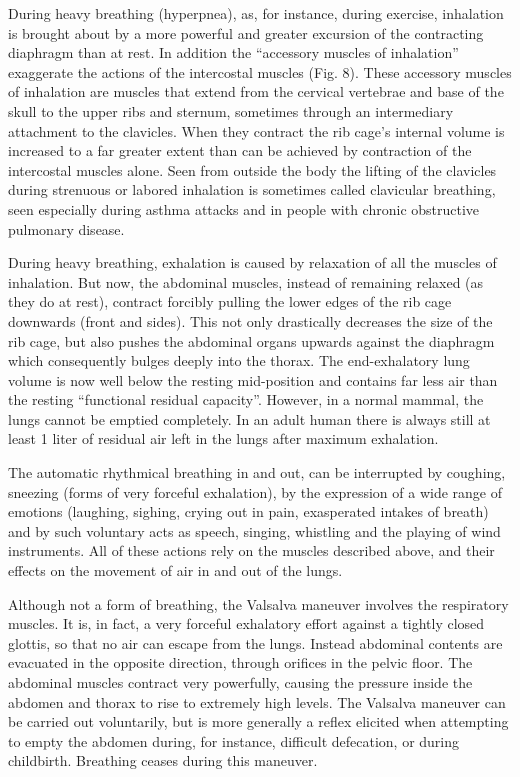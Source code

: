 During heavy breathing (hyperpnea), as, for instance, during exercise, inhalation is brought about by a more powerful and greater excursion of the contracting diaphragm than at rest. In addition the ``accessory muscles of inhalation'' exaggerate the actions of the intercostal muscles (Fig. 8). These accessory muscles of inhalation are muscles that extend from the cervical vertebrae and base of the skull to the upper ribs and sternum, sometimes through an intermediary attachment to the clavicles. When they contract the rib cage's internal volume is increased to a far greater extent than can be achieved by contraction of the intercostal muscles alone. Seen from outside the body the lifting of the clavicles during strenuous or labored inhalation is sometimes called clavicular breathing, seen especially during asthma attacks and in people with chronic obstructive pulmonary disease.

During heavy breathing, exhalation is caused by relaxation of all the muscles of inhalation. But now, the abdominal muscles, instead of remaining relaxed (as they do at rest), contract forcibly pulling the lower edges of the rib cage downwards (front and sides). This not only drastically decreases the size of the rib cage, but also pushes the abdominal organs upwards against the diaphragm which consequently bulges deeply into the thorax. The end-exhalatory lung volume is now well below the resting mid-position and contains far less air than the resting ``functional residual capacity''. However, in a normal mammal, the lungs cannot be emptied completely. In an adult human there is always still at least 1 liter of residual air left in the lungs after maximum exhalation.

The automatic rhythmical breathing in and out, can be interrupted by coughing, sneezing (forms of very forceful exhalation), by the expression of a wide range of emotions (laughing, sighing, crying out in pain, exasperated intakes of breath) and by such voluntary acts as speech, singing, whistling and the playing of wind instruments. All of these actions rely on the muscles described above, and their effects on the movement of air in and out of the lungs.

Although not a form of breathing, the Valsalva maneuver involves the respiratory muscles. It is, in fact, a very forceful exhalatory effort against a tightly closed glottis, so that no air can escape from the lungs. Instead abdominal contents are evacuated in the opposite direction, through orifices in the pelvic floor. The abdominal muscles contract very powerfully, causing the pressure inside the abdomen and thorax to rise to extremely high levels. The Valsalva maneuver can be carried out voluntarily, but is more generally a reflex elicited when attempting to empty the abdomen during, for instance, difficult defecation, or during childbirth. Breathing ceases during this maneuver.

